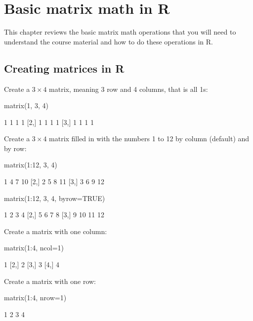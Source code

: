 

\chapter{Basic matrix math in R}
\label{chap:basicmat}

This chapter reviews the basic matrix math operations that you will need to understand the course material and how to do these operations in R.

\section{Creating matrices in R}
Create a $3 \times 4$ matrix, meaning 3 row and 4 columns, that is all 1s:
\begin{Schunk}
\begin{Sinput}
 matrix(1, 3, 4)
\end{Sinput}
\begin{Soutput}
     [,1] [,2] [,3] [,4]
[1,]    1    1    1    1
[2,]    1    1    1    1
[3,]    1    1    1    1
\end{Soutput}
\end{Schunk}
Create a $3 \times 4$ matrix filled in with the numbers 1 to 12 by column (default) and by row:
\begin{Schunk}
\begin{Sinput}
 matrix(1:12, 3, 4)
\end{Sinput}
\begin{Soutput}
     [,1] [,2] [,3] [,4]
[1,]    1    4    7   10
[2,]    2    5    8   11
[3,]    3    6    9   12
\end{Soutput}
\begin{Sinput}
 matrix(1:12, 3, 4, byrow=TRUE)
\end{Sinput}
\begin{Soutput}
     [,1] [,2] [,3] [,4]
[1,]    1    2    3    4
[2,]    5    6    7    8
[3,]    9   10   11   12
\end{Soutput}
\end{Schunk}
Create a matrix with one column:
\begin{Schunk}
\begin{Sinput}
 matrix(1:4, ncol=1)
\end{Sinput}
\begin{Soutput}
     [,1]
[1,]    1
[2,]    2
[3,]    3
[4,]    4
\end{Soutput}
\end{Schunk}
Create a matrix with one row:
\begin{Schunk}
\begin{Sinput}
 matrix(1:4, nrow=1)
\end{Sinput}
\begin{Soutput}
     [,1] [,2] [,3] [,4]
[1,]    1    2    3    4
\end{Soutput}
\end{Schunk}
